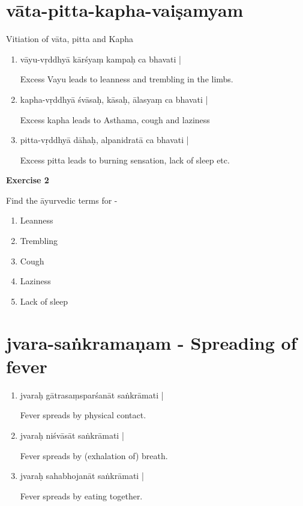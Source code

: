 \chapter{vāta-pitta-kapha-vaiṣamyam}
\begin{center}
Vitiation of vāta, pitta and Kapha
\end{center}
\begin{enumerate}
\item {}

vāyu-vṛddhyā kārśyaṃ kampaḥ ca bhavati |

Excess Vayu leads to leanness and trembling in the limbs.

\item {}

kapha-vṛddhyā śvāsaḥ, kāsaḥ, ālasyaṃ ca bhavati |

Excess kapha leads to Asthama, cough and laziness

\item {}

pitta-vṛddhyā dāhaḥ, alpanidratā ca bhavati |  

Excess pitta leads to burning sensation, lack of sleep etc.
\end{enumerate}

\begin{center}
\textbf{\large Exercise 2}
\end{center}

Find the āyurvedic terms for -
\begin{enumerate}
\renewcommand{\theenumi}{\alph{enumi}}
\renewcommand{\labelenumi}{\theenumi.}
\item Leanness
\item Trembling
\item Cough 
\item Laziness 
\item Lack of sleep 
\end{enumerate}

\chapter{jvara-saṅkramaṇam - Spreading of fever}

\begin{enumerate}
\item {}

jvaraḥ gātrasaṃsparśanāt saṅkrāmati |

Fever spreads by physical contact.

\item {}

jvaraḥ niśvāsāt saṅkrāmati |

Fever spreads by (exhalation of) breath. 

\item {}

jvaraḥ sahabhojanāt saṅkrāmati |

Fever spreads by eating together.
\end{enumerate}

